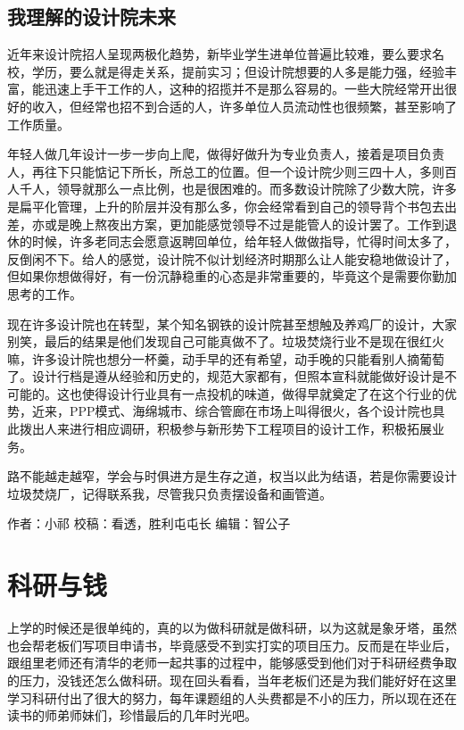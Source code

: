 \documentclass[
]{book}
\begin{document}
\hypertarget{ux6211ux7406ux89e3ux7684ux8bbeux8ba1ux9662ux672aux6765}{%
\subsection{我理解的设计院未来}\label{ux6211ux7406ux89e3ux7684ux8bbeux8ba1ux9662ux672aux6765}}

近年来设计院招人呈现两极化趋势，新毕业学生进单位普遍比较难，要么要求名校，学历，要么就是得走关系，提前实习；但设计院想要的人多是能力强，经验丰富，能迅速上手干工作的人，这种的招揽并不是那么容易的。一些大院经常开出很好的收入，但经常也招不到合适的人，许多单位人员流动性也很频繁，甚至影响了工作质量。

年轻人做几年设计一步一步向上爬，做得好做升为专业负责人，接着是项目负责人，再往下只能惦记下所长，所总工的位置。但一个设计院少则三四十人，多则百人千人，领导就那么一点比例，也是很困难的。而多数设计院除了少数大院，许多是扁平化管理，上升的阶层并没有那么多，你会经常看到自己的领导背个书包去出差，亦或是晚上熬夜出方案，更加能感觉领导不过是能管人的设计罢了。工作到退休的时候，许多老同志会愿意返聘回单位，给年轻人做做指导，忙得时间太多了，反倒闲不下。给人的感觉，设计院不似计划经济时期那么让人能安稳地做设计了，但如果你想做得好，有一份沉静稳重的心态是非常重要的，毕竟这个是需要你勤加思考的工作。

现在许多设计院也在转型，某个知名钢铁的设计院甚至想触及养鸡厂的设计，大家别笑，最后的结果是他们发现自己可能真做不了。垃圾焚烧行业不是现在很红火嘛，许多设计院也想分一杯羹，动手早的还有希望，动手晚的只能看别人摘葡萄了。设计行档是遵从经验和历史的，规范大家都有，但照本宣科就能做好设计是不可能的。这也使得设计行业具有一点投机的味道，做得早就奠定了在这个行业的优势，近来，PPP模式、海绵城市、综合管廊在市场上叫得很火，各个设计院也具此拨出人来进行相应调研，积极参与新形势下工程项目的设计工作，积极拓展业务。

路不能越走越窄，学会与时俱进方是生存之道，权当以此为结语，若是你需要设计垃圾焚烧厂，记得联系我，尽管我只负责摆设备和画管道。

作者：小祁
校稿：看透，胜利屯屯长
编辑：智公子

\hypertarget{ux79d1ux7814ux4e0eux94b1}{%
\section{科研与钱}\label{ux79d1ux7814ux4e0eux94b1}}

上学的时候还是很单纯的，真的以为做科研就是做科研，以为这就是象牙塔，虽然也会帮老板们写项目申请书，毕竟感受不到实打实的项目压力。反而是在毕业后，跟组里老师还有清华的老师一起共事的过程中，能够感受到他们对于科研经费争取的压力，没钱还怎么做科研。现在回头看看，当年老板们还是为我们能好好在这里学习科研付出了很大的努力，每年课题组的人头费都是不小的压力，所以现在还在读书的师弟师妹们，珍惜最后的几年时光吧。
\end{document}
